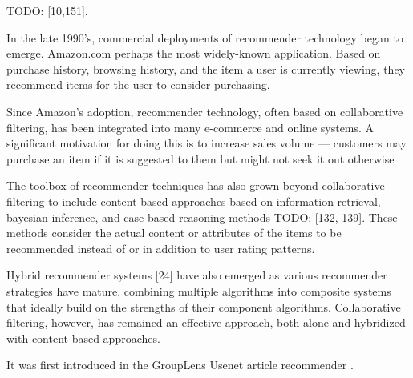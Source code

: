 TODO: [10,151]. 

In the late 1990's, commercial deployments of recommender technology began to emerge. Amazon.com perhaps the most widely-known application. Based on purchase history, browsing history, and the item a user is currently viewing, they recommend items for the user to consider purchasing. 

Since Amazon’s adoption, recommender technology, often based on
collaborative filtering, has been integrated into many e-commerce and
online systems. A significant motivation for doing this is to increase
sales volume — customers may purchase an item if it is suggested to
them but might not seek it out otherwise

The toolbox of recommender techniques has also grown beyond
collaborative filtering to include content-based approaches based on
information retrieval, bayesian inference, and case-based reasoning
methods
TODO: [132, 139].
These methods consider the actual content or attributes of the items to be recommended instead of or in addition to user rating patterns. 

Hybrid recommender systems [24] have also emerged as various recommender strategies have mature, combining multiple algorithms into composite systems that ideally build on the strengths of their component algorithms. Collaborative filtering, however,
has remained an effective approach, both alone and hybridized
with content-based approaches.


It was first introduced in the GroupLens Usenet article recommender \cite{grouplens}. 
